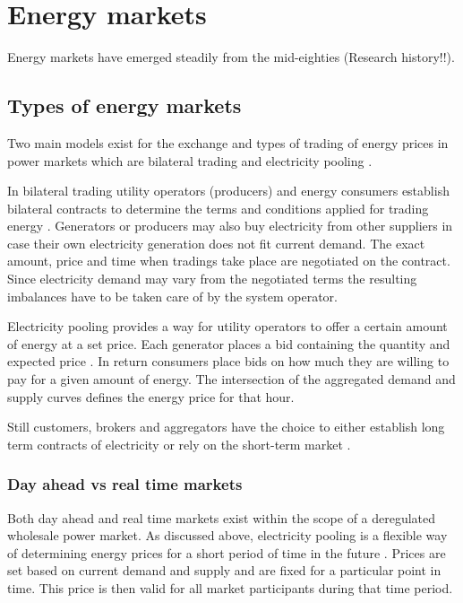

\section{Energy markets}

Energy markets have emerged steadily from the mid-eighties (Research history!!). 






\subsection{Types of energy markets}

Two main models exist for the exchange and types of trading of energy prices in power markets which are bilateral trading and electricity pooling \cite{onaiwu2009does,hogan1997reshaping,barroso2005classification}.

In bilateral trading utility operators (producers) and energy consumers establish bilateral contracts to determine the terms and conditions applied for trading energy \cite{onaiwu2009does}. Generators or producers may also buy electricity from other suppliers in case their own electricity generation does not fit current demand. The exact amount, price and time when tradings take place are negotiated on the contract. Since electricity demand may vary from the negotiated terms the resulting imbalances have to be taken care of by the system operator. 

Electricity pooling provides a way for utility operators to offer a certain amount of energy at a set price. Each generator places a bid containing the quantity and expected price \cite{barroso2005classification}. In return consumers place bids on how much they are willing to pay for a given amount of energy. The intersection of the aggregated demand and supply curves defines the energy price for that hour. 

Still customers, brokers and aggregators have the choice to either establish long term contracts of electricity or rely on the short-term market \cite{hogan1997reshaping}.


\subsubsection{Day ahead vs real time markets}

Both day ahead and real time markets exist within the scope of a deregulated wholesale power market. As discussed above, electricity pooling is a flexible way of determining energy prices for a short period of time in the future \cite{hogan1997reshaping}. Prices are set based on current demand and supply and are fixed for a particular point in time. This price is then valid for all market participants during that time period. 

